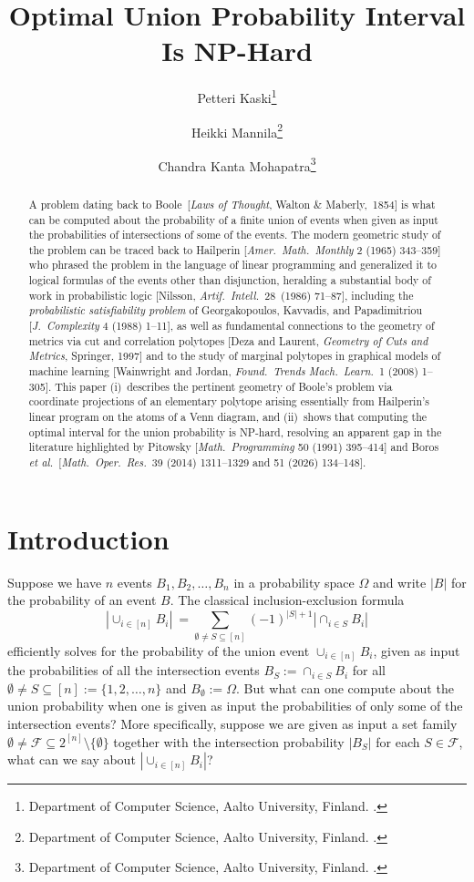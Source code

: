 \documentclass[11pt]{article}
\title{Optimal Union Probability Interval Is NP-Hard}
\author{ 
{Petteri Kaski\thanks{Department of Computer Science, Aalto University, Finland. \ehref{petteri.kaski@aalto.fi}.}}
\and 
{Heikki Mannila\thanks{Department of Computer Science, Aalto University, Finland. \ehref{heikki.mannila@aalto.fi}.}}
\and
{Chandra Kanta Mohapatra\thanks{Department of Computer Science, Aalto University, Finland. \ehref{chandra.mohapatra@aalto.fi}.}}
}
\date{}
\begin{document}
\maketitle

\begin{abstract}
A problem dating back to Boole~[{\em Laws of Thought}, Walton \& Maberly,~1854]
is what can be computed about the probability of a finite union of events 
when given as input the probabilities of intersections of some of the events.
The modern geometric study of the problem can be traced back to 
Hailperin [{\em Amer.~Math.~Monthly} 2 (1965) 343--359] who phrased the 
problem in the language of linear programming and generalized it to
logical formulas of the events other than disjunction, 
heralding a substantial body of work in probabilistic logic 
[Nilsson, {\em Artif.\ Intell.}\ 28~(1986) 71--87], including the 
{\em probabilistic satisfiability problem} of 
Georgakopoulos, Kavvadis, and Papadimitriou 
[{\em J.~Complexity} 4 (1988) 1--11], as well as fundamental connections to 
the geometry of metrics via cut and correlation polytopes 
[Deza and Laurent, {\em Geometry of Cuts and Metrics}, Springer, 1997]
and to the study of marginal polytopes in graphical models of machine learning 
[Wainwright and Jordan, {\em Found.\ Trends Mach.\ Learn.}\ 1 (2008) 1--305].
This paper (i)~describes the pertinent geometry of Boole's problem 
via coordinate projections of an elementary polytope arising essentially 
from Hailperin's linear program on the atoms of a Venn diagram, 
and (ii)~shows that computing the optimal interval for the union probability 
is NP-hard, resolving an apparent gap in the literature highlighted by Pitowsky [{\em Math.\ Programming} 50 (1991) 395--414] and 
Boros {\em et al.}\ [{\em Math.\ Oper.\ Res.}\ 39 (2014) 1311--1329 and 51 (2026) 134--148]. 
\end{abstract} 


\section{Introduction}

\label{sect:introduction}

Suppose we have $n$ events $B_1,B_2,\ldots,B_n$ in a probability space
$\Omega$ and write $|B|$ for the probability of an event $B$.
The classical inclusion-exclusion formula 
\begin{equation}
\label{eq:inclusion-exclusion}
|\!\cup_{i\in[n]}B_i|\ =\!\sum_{\emptyset\neq S\subseteq [n]}(-1)^{|S|+1}|\!\cap_{i\in S}B_i|
\end{equation}
efficiently solves for the probability of the union event $\cup_{i\in[n]}B_i$, 
given as input the probabilities of all the intersection events 
$B_S:=\cap_{i\in S}B_i$ 
for all $\emptyset\neq S\subseteq[n]:=\{1,2,\ldots,n\}$ and 
$B_\emptyset:=\Omega$. But what can one compute about the union 
probability when one is given as input the probabilities of only some of the 
intersection events? More specifically, suppose we are given as input
a set family $\emptyset\neq\mathcal{F}\subseteq 2^{[n]}\setminus\{\emptyset\}$
together with the intersection probability $|B_S|$ for each $S\in\mathcal{F}$, 
what can we say about $|\!\cup_{i\in[n]}B_i|$?
\end{document}
